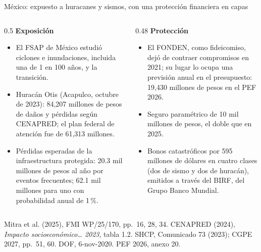 \documentclass[aspectratio=169,11pt]{beamer}
\newcommand{\fuente}[1]{\par\vfill{\small\color{cGris}#1\par}}
\newcommand{\FMI}{Mitra et al. (2025), FMI WP/25/170}
\begin{document}
\begin{frame}{México: expuesto a huracanes y sismos, con una protección financiera en capas}
  \small
  \begin{columns}[T]
    \begin{column}{0.5\textwidth}
      \textbf{Exposición}
      \begin{itemize}
        \item<1-> El FSAP de México estudió ciclones e inundaciones, incluida una de 1 en 100 años, y la transición.
        \item<2-> Huracán Otis (Acapulco, octubre de 2023): 84,207 millones de pesos de daños y pérdidas según CENAPRED; el plan federal de atención fue de 61,313 millones.
        \item<3-> Pérdidas esperadas de la infraestructura protegida: 20.3 mil millones de pesos al año por eventos frecuentes; 62.1 mil millones para uno con probabilidad anual de 1\,\%.
      \end{itemize}
    \end{column}
    \begin{column}{0.48\textwidth}
      \textbf{Protección}
      \begin{itemize}
        \item<4-> El FONDEN, como fideicomiso, dejó de contraer compromisos en 2021; su lugar lo ocupa una previsión anual en el presupuesto: 19,430 millones de pesos en el PEF 2026.
        \item<5-> Seguro paramétrico de 10 mil millones de pesos, el doble que en 2025.
        \item<6-> Bonos catastróficos por 595 millones de dólares en cuatro clases (dos de sismo y dos de huracán), emitidos a través del BIRF, del Grupo Banco Mundial.
      \end{itemize}
    \end{column}
  \end{columns}
  \fuente{\FMI, pp.~16, 28, 34. CENAPRED (2024), \emph{Impacto socioeconómico\ldots{} 2023}, tabla 1.2. SHCP, Comunicado 73 (2023); CGPE 2027, pp.~51, 60. DOF, 6-nov-2020. PEF 2026, anexo 20.}
\end{frame}
\end{document}
